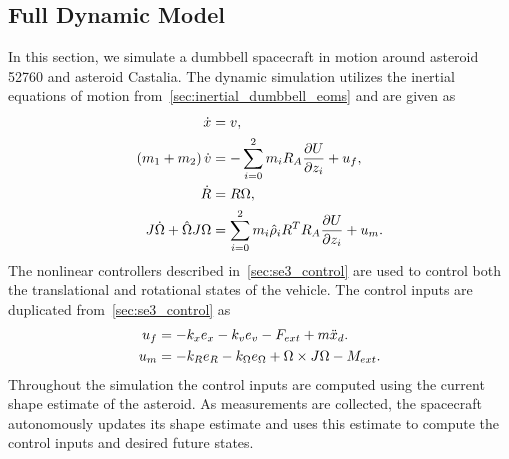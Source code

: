 \subsection{Full Dynamic Model }\label{sec:dynamic_exploration}
In this section, we simulate a dumbbell spacecraft in motion around asteroid \num{52760} and asteroid Castalia.
The dynamic simulation utilizes the inertial equations of motion from~\cref{sec:inertial_dumbbell_eoms} and are given as
\begin{align*}
    \dot{x} &= v, \\
    \left( m_1 + m_2 \right) \dot{v} &= - \sum_{i=0}^2 m_i R_A \frac{\partial U}{\partial z_i} + u_f, \\
    \dot{R} &= R \Omega, \\
    J \dot{\Omega} + \hat{\Omega} J \Omega &= \sum_{i=0}^2 m_i \hat{\rho}_i R^T R_A \frac{\partial U}{\partial z_i} + u_m. 
\end{align*}
The nonlinear controllers described in~\cref{sec:se3_control} are used to control both the translational and rotational states of the vehicle.
The control inputs are duplicated from~\cref{sec:se3_control} as
\begin{align*}
    u_f &= -k_x e_x - k_v e_v - F_{ext} + m \ddot{x}_d . \\
    u_m &= -k_R e_R - k_\Omega e_\Omega + \Omega \times J \Omega - M_{ext}.
\end{align*}
Throughout the simulation the control inputs are computed using the current shape estimate of the asteroid. 
As measurements are collected, the spacecraft autonomously updates its shape estimate and uses this estimate to compute the control inputs and desired future states.


